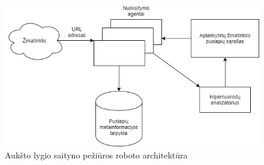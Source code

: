 \begin{figure}[ht]
\centering
\includegraphics[scale=0.6]{img/Web_Crawler_Architecture.png}
\caption{Aukšto lygio saityno pežiūros roboto architektūra}
\label{fig:high_level_architecture}
\end{figure}